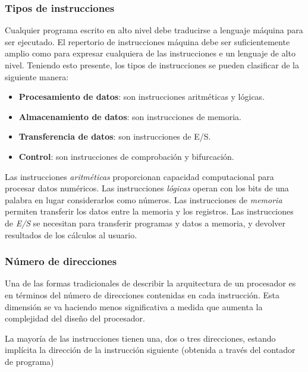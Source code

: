\begin{subs}
  \subsubsection{Tipos de instrucciones}

  Cualquier programa escrito en alto nivel debe traducirse a lenguaje máquina para ser ejecutado. El repertorio de instrucciones máquina debe ser suficientemente amplio como para expresar cualquiera de las instrucciones e un lenguaje de alto nivel. Teniendo esto presente, los tipos de instrucciones se pueden clasificar de la siguiente manera:
  \begin{itemize}
    \item \textbf{Procesamiento de datos}: son instrucciones aritméticas y lógicas.
    \item \textbf{Almacenamiento de datos}: son instrucciones de memoria.
    \item \textbf{Transferencia de datos}: son instrucciones de E/S.
    \item \textbf{Control}: son instrucciones de comprobación y bifurcación.
  \end{itemize}

  Las instrucciones \textit{aritméticas} proporcionan capacidad computacional para procesar datos numéricos. Las instrucciones \textit{lógicas} operan con los bits de una palabra en lugar considerarlos como números. Las instrucciones de \textit{memoria} permiten transferir los datos entre la memoria y los registros. Las instrucciones de \textit{E/S} se necesitan para transferir programas y datos a memoria, y devolver resultados de los cálculos al usuario.

  \subsubsection{Número de direcciones}

  Una de las formas tradicionales de describir la arquitectura de un procesador es en términos del número de direcciones contenidas en cada instrucción. Esta dimensión se va haciendo menos significativa a medida que aumenta la complejidad del diseño del procesador.

  La mayoría de las instrucciones tienen una, dos o tres direcciones, estando implícita la dirección de la instrucción siguiente (obtenida a través del contador de programa)


\end{subs}
